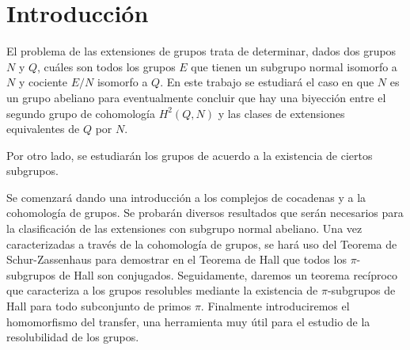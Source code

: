 
\chapter{Introducción}

El problema de las extensiones de grupos trata de determinar, dados dos grupos $N$ y $Q$, cuáles son todos los grupos $E$ que tienen un subgrupo normal isomorfo a $N$ y cociente $E/N$ isomorfo a $Q$. En este trabajo se estudiará el caso en que $N$ es un grupo abeliano para eventualmente concluir que hay una biyección entre el segundo grupo de cohomología $H^2(Q,N)$ y las clases de extensiones equivalentes de $Q$ por $N$.

Por otro lado, se estudiarán los grupos de acuerdo a la existencia de ciertos subgrupos.

Se comenzará dando una introducción a los complejos de cocadenas y a la cohomología de grupos. Se probarán diversos resultados que serán necesarios para la clasificación de las extensiones con subgrupo normal abeliano. Una vez caracterizadas a través de la cohomología de grupos, se hará uso del Teorema de Schur-Zassenhaus para demostrar en el Teorema de Hall que todos los $\pi$-subgrupos de Hall son conjugados. Seguidamente, daremos un teorema recíproco que caracteriza a los grupos resolubles mediante la existencia de $\pi$-subgrupos de Hall para todo subconjunto de primos $\pi$. Finalmente introduciremos el homomorfismo del transfer, una herramienta muy útil para el estudio de la resolubilidad de los grupos.
